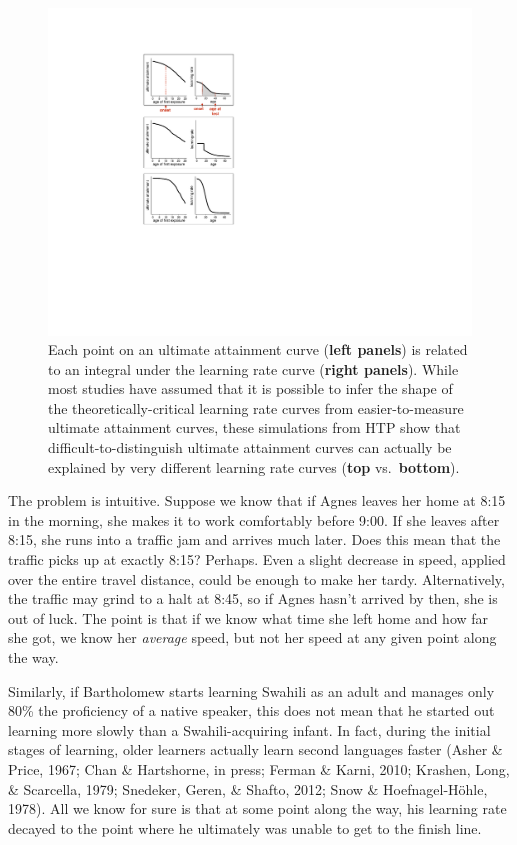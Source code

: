 \documentclass[
  english,
  doc,floatsintext]{apa6}
\begin{document}
\begin{figure}
\includegraphics[width=1.5\linewidth]{Figures/FigUA} \caption{Each point on an ultimate attainment curve (\textbf{left panels}) is related to an integral under the learning rate curve (\textbf{right panels}). While most studies have assumed that it is possible to infer the shape of the theoretically-critical learning rate curves from easier-to-measure ultimate attainment curves, these simulations from HTP show that difficult-to-distinguish ultimate attainment curves can actually be explained by very different learning rate curves (\textbf{top} vs.~\textbf{bottom}).}\label{fig:FigUA}
\end{figure}

The problem is intuitive. Suppose we know that if Agnes leaves her home at 8:15 in the morning, she makes it to work comfortably before 9:00. If she leaves after 8:15, she runs into a traffic jam and arrives much later. Does this mean that the traffic picks up at exactly 8:15? Perhaps. Even a slight decrease in speed, applied over the entire travel distance, could be enough to make her tardy. Alternatively, the traffic may grind to a halt at 8:45, so if Agnes hasn't arrived by then, she is out of luck. The point is that if we know what time she left home and how far she got, we know her \emph{average} speed, but not her speed at any given point along the way.

Similarly, if Bartholomew starts learning Swahili as an adult and manages only 80\% the proficiency of a native speaker, this does not mean that he started out learning more slowly than a Swahili-acquiring infant. In fact, during the initial stages of learning, older learners actually learn second languages faster (Asher \& Price, 1967; Chan \& Hartshorne, in press; Ferman \& Karni, 2010; Krashen, Long, \& Scarcella, 1979; Snedeker, Geren, \& Shafto, 2012; Snow \& Hoefnagel-Höhle, 1978). All we know for sure is that at some point along the way, his learning rate decayed to the point where he ultimately was unable to get to the finish line.
\end{document}
